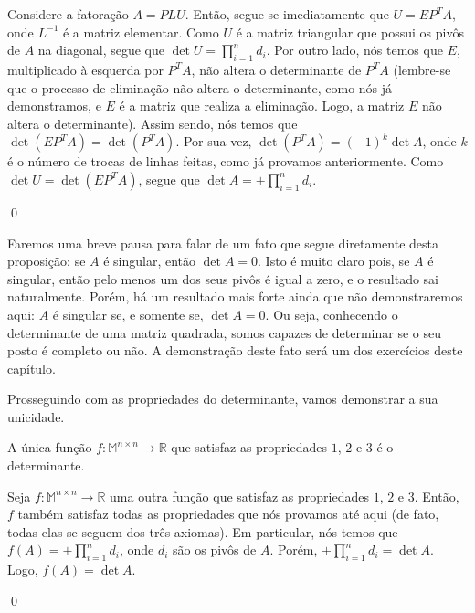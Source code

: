 \begin{Proof}
	Considere a fatoração $A = PLU$. Então, segue-se imediatamente que $U = EP^TA$, onde $L^{-1}$ é a matriz elementar. Como $U$ é a matriz triangular que possui os pivôs de $A$ na diagonal, segue que $\det U = \prod\limits_{i = 1}^{n}d_i$. Por outro lado, nós temos que $E$, multiplicado à esquerda por $P^TA$, não altera o determinante de $P^TA$ (lembre-se que o processo de eliminação não altera o determinante, como nós já demonstramos, e $E$ é a matriz que realiza a eliminação. Logo, a matriz $E$ não altera o determinante). Assim sendo, nós temos que $\det(EP^TA) = \det(P^TA)$. Por sua vez, $\det(P^TA) = (-1)^k\det A$, onde $k$ é o número de trocas de linhas feitas, como já provamos anteriormente. Como $\det U = \det(EP^TA)$, segue que $\det A = \pm\prod\limits_{i = 1}^{n}d_i$.
	
	\qed
\end{Proof}

Faremos uma breve pausa para falar de um fato que segue diretamente desta proposição: se $A$ é singular, então $\det A = 0$. Isto é muito claro pois, se $A$ é singular, então pelo menos um dos seus pivôs é igual a zero, e o resultado sai naturalmente. Porém, há um resultado mais forte ainda que não demonstraremos aqui: $A$ é singular se, e somente se, $\det A = 0$. Ou seja, conhecendo o determinante de uma matriz quadrada, somos capazes de determinar se o seu posto é completo ou não. A demonstração deste fato será um dos exercícios deste capítulo.

Prosseguindo com as propriedades do determinante, vamos demonstrar a sua unicidade.

\begin{Theorem}
	A única função $f:\mathbb{M}^{n\times n}\to\mathbb{R}$ que satisfaz as propriedades $1$, $2$ e $3$ é o determinante.
\end{Theorem}

\begin{Proof}
	Seja $f:\mathbb{M}^{n\times n}\to\mathbb{R}$ uma outra função que satisfaz as propriedades $1$, $2$ e $3$. Então, $f$ também satisfaz todas as propriedades que nós provamos até aqui (de fato, todas elas se seguem dos três axiomas). Em particular, nós temos que $f(A) = \pm\prod\limits_{i = 1}^{n} d_i$, onde $d_i$ são os pivôs de $A$. Porém, $\pm\prod\limits_{i = 1}^{n} d_i = \det A$. Logo, $f(A) = \det A$.
	
	\qed
\end{Proof}

